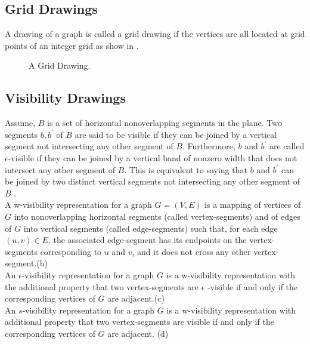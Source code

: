 \subsection{Grid Drawings}

A drawing of a graph is called a grid drawing if the vertices are all located at grid points of an integer grid as show in .



\begin{figure}[!tb]
\centering
\resizebox{50mm}{!}{}
\caption{A Grid Drawing.}
\label{fig:grid_drawings}
\end{figure}



\subsection{Visibility Drawings}

Assume, $B$ is a set of horizontal nonoverlapping segments in the plane. Two segments $b, b^\prime$ of $B$ are said to be visible if they can be joined by a vertical segment not intersecting any other segment of $B$. Furthermore, $b$ and $b^\prime$ are called ${\epsilon}$-visible if they can be joined by a vertical band of nonzero width that does not intersect any other segment of $B$. This is equivalent to saying that $b$ and $b^\prime $ can be joined by two distinct vertical segments not intersecting any other segment of $B$ .
\\

A w-visibility representation for a graph $G = (V, E)$ is a mapping of vertices of $G$ into nonoverlapping horizontal segments (called vertex-segments) and of edges of $G$ into vertical segments (called edge-segments) such that, for each edge $(u, v) \in E$, the associated edge-segment has its endpoints on the vertex-segments corresponding to $u$ and $v$, and it does not cross any other vertex-segment.(b)
\\

An ${\epsilon}$-visibility representation for a graph $G$ is a w-visibility representation with the additional property that two vertex-segments are ${\epsilon}$ -visible if and only if the corresponding vertices of $G$ are adjacent.(c)
\\

An $s$-visibility representation for a graph $G$ is a w-visibility representation with additional property that two vertex-segments are visible if and only if the corresponding vertices of $G$ are adjacent. (d)


